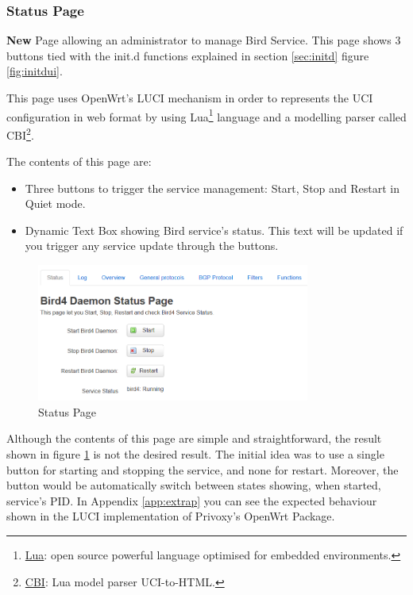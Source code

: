 \subsubsection{Status Page}
\textbf{New} Page allowing an administrator to manage Bird Service. This page shows 3 buttons tied with the init.d functions explained in section \ref{sec:initd} figure \ref{fig:initdui}.

This page uses OpenWrt's LUCI mechanism in order to represents the UCI configuration in web format by using Lua\footnote{\href{https://www.lua.org/manual/5.1/}{Lua}: open source powerful language optimised for embedded environments.} language and a modelling parser called CBI\footnote{\href{https://github.com/openwrt/luci/wiki/CBI}{CBI}: Lua model parser UCI-to-HTML.}.

The contents of this page are:
\begin{itemize}
    \item Three buttons to trigger the service management: Start, Stop and Restart in Quiet mode.
    \item Dynamic Text Box showing Bird service's status. This text will be updated if you trigger any service update through the buttons.
\end{itemize}

\begin{figure}[H]
    \centering
    \includegraphics[width=0.8\textwidth]{images/bird0.3/status}
    \caption{Status Page}
    \label{fig:statusp}
\end{figure}

Although the contents of this page are simple and straightforward, the result shown in figure \ref{fig:statusp} is not the desired result. The initial idea was to use a single button for starting and stopping the service, and none for restart. Moreover, the button would be automatically switch between states showing, when started, service's PID. In Appendix \ref{app:extrap} you can see the expected behaviour shown in the LUCI implementation of Privoxy's OpenWrt Package.


